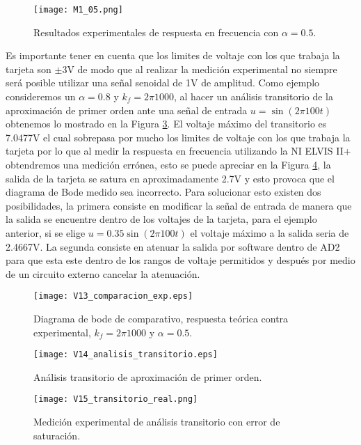 	
	\begin{figure}[!ht] 
		\caption{Resultados experimentales de respuesta en frecuencia con $\alpha = 0.5$.}
		\label{fig:M1_05}
		\centering
		\texttt{[image: M1\_05.png]}
	\end{figure}
	
	Es importante tener en cuenta que los limites de voltaje con los que trabaja la tarjeta son $\pm 3$V de modo que al realizar la medición experimental no siempre será posible utilizar una señal senoidal de 1V de amplitud. Como ejemplo consideremos un $\alpha = 0.8$ y $k_{f} = 2 \pi 1000$, al hacer un análisis transitorio de la aproximación de primer orden ante una señal de entrada $u = \sin(2 \pi 100 t)$ obtenemos lo mostrado en la Figura \ref{fig:V14_analisis_transitorio}. El voltaje máximo del transitorio es 7.0477V el cual sobrepasa por mucho los limites de voltaje con los que trabaja la tarjeta por lo que al medir la respuesta en frecuencia utilizando la NI ELVIS II+ obtendremos una medición errónea, esto se puede apreciar en la Figura \ref{fig:V15_transitorio_real}, la salida de la tarjeta se satura en aproximadamente 2.7V y esto provoca que el diagrama de Bode medido sea incorrecto. Para solucionar esto existen dos posibilidades, la primera consiste en modificar la señal de entrada de manera que la salida se encuentre dentro de los voltajes de la tarjeta, para el ejemplo anterior, si se elige $u = 0.35\sin(2 \pi 100 t)$ el voltaje máximo a la salida seria de 2.4667V. La segunda consiste en atenuar la salida por software dentro de AD2 para que esta este dentro de los rangos de voltaje permitidos y después por medio de un circuito externo cancelar la atenuación.
	
	\begin{figure}[hbtp]
		\caption{Diagrama de bode de comparativo, respuesta teórica contra experimental,  $k_{f} = 2\pi 1000$ y  $\alpha = 0.5$.} 
		\label{fig:V13_comparacion_exp}
		\centering
		\texttt{[image: V13\_comparacion\_exp.eps]}
	\end{figure}
	
	\begin{figure}[!ht]
		\caption{Análisis transitorio de aproximación de primer orden.} 
		\label{fig:V14_analisis_transitorio}
		\centering
		\texttt{[image: V14\_analisis\_transitorio.eps]}
	\end{figure}
	
	\begin{figure}[!ht]
		\caption{Medición experimental de análisis transitorio con error de saturación.} 
		\label{fig:V15_transitorio_real}
		\centering
		\texttt{[image: V15\_transitorio\_real.png]}
	\end{figure}

